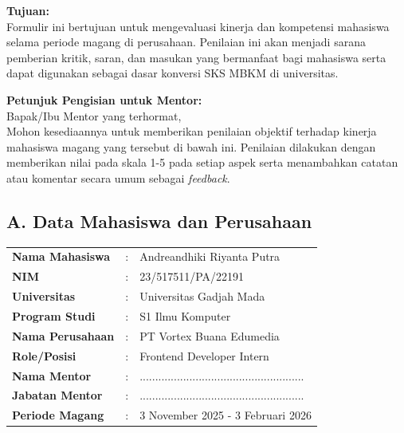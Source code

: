 \textbf{Tujuan:}\\
Formulir ini bertujuan untuk mengevaluasi kinerja dan kompetensi mahasiswa selama periode magang di perusahaan. Penilaian ini akan menjadi sarana pemberian kritik, saran, dan masukan yang bermanfaat bagi mahasiswa serta dapat digunakan sebagai dasar konversi SKS MBKM di universitas.

\vspace{0.3cm}
\noindent\textbf{Petunjuk Pengisian untuk Mentor:}\\
Bapak/Ibu Mentor yang terhormat,\\
Mohon kesediaannya untuk memberikan penilaian objektif terhadap kinerja mahasiswa magang yang tersebut di bawah ini. Penilaian dilakukan dengan memberikan nilai pada skala 1-5 pada setiap aspek serta menambahkan catatan atau komentar secara umum sebagai \textit{feedback}.

\vspace{0.5cm}
\subsection*{A. Data Mahasiswa dan Perusahaan}
\begin{table}[h]
	\renewcommand{\arraystretch}{1.5}
	\begin{tabular}{p{5.5cm} l p{8cm}}
		\textbf{Nama Mahasiswa}  & : & Andreandhiki Riyanta Putra                            \\
		\textbf{NIM}             & : & 23/517511/PA/22191                                    \\
		\textbf{Universitas}     & : & Universitas Gadjah Mada                               \\
		\textbf{Program Studi}   & : & S1 Ilmu Komputer                                      \\
		\textbf{Nama Perusahaan} & : & PT Vortex Buana Edumedia                              \\
		\textbf{Role/Posisi}     & : & Frontend Developer Intern                             \\
		\textbf{Nama Mentor}     & : & ..................................................... \\
		\textbf{Jabatan Mentor}  & : & ..................................................... \\
		\textbf{Periode Magang}  & : & 3 November 2025 - 3 Februari 2026                     \\
	\end{tabular}
\end{table}

